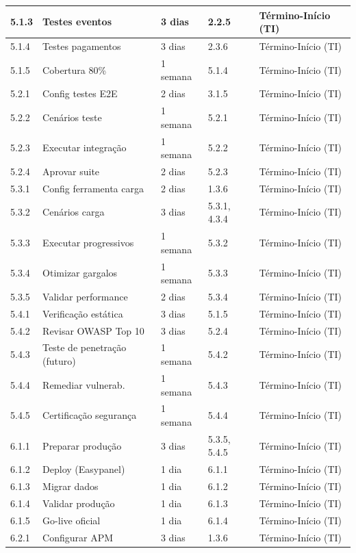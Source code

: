 \begin{table}[H]
\begin{tabular}{|p{1cm}|p{5cm}|p{2cm}|p{1.5cm}|p{3cm}|}
5.1.3 & Testes eventos & 3 dias & 2.2.5 & Término-Início (TI) \\ \hline
5.1.4 & Testes pagamentos & 3 dias & 2.3.6 & Término-Início (TI) \\ \hline
5.1.5 & Cobertura 80\% & 1 semana & 5.1.4 & Término-Início (TI) \\ \hline
5.2.1 & Config testes E2E & 2 dias & 3.1.5 & Término-Início (TI) \\ \hline
5.2.2 & Cenários teste & 1 semana & 5.2.1 & Término-Início (TI) \\ \hline
5.2.3 & Executar integração & 1 semana & 5.2.2 & Término-Início (TI) \\ \hline
5.2.4 & Aprovar suite & 2 dias & 5.2.3 & Término-Início (TI) \\ \hline
5.3.1 & Config ferramenta carga & 2 dias & 1.3.6 & Término-Início (TI) \\ \hline
5.3.2 & Cenários carga & 3 dias & 5.3.1, 4.3.4 & Término-Início (TI) \\ \hline
5.3.3 & Executar progressivos & 1 semana & 5.3.2 & Término-Início (TI) \\ \hline
5.3.4 & Otimizar gargalos & 1 semana & 5.3.3 & Término-Início (TI) \\ \hline
5.3.5 & Validar performance & 2 dias & 5.3.4 & Término-Início (TI) \\ \hline
5.4.1 & Verificação estática & 3 dias & 5.1.5 & Término-Início (TI) \\ \hline
5.4.2 & Revisar OWASP Top 10 & 3 dias & 5.2.4 & Término-Início (TI) \\ \hline
5.4.3 & Teste de penetração (futuro) & 1 semana & 5.4.2 & Término-Início (TI) \\ \hline
5.4.4 & Remediar vulnerab. & 1 semana & 5.4.3 & Término-Início (TI) \\ \hline
5.4.5 & Certificação segurança & 1 semana & 5.4.4 & Término-Início (TI) \\ \hline
6.1.1 & Preparar produção & 3 dias & 5.3.5, 5.4.5 & Término-Início (TI) \\ \hline
6.1.2 & Deploy (Easypanel) & 1 dia & 6.1.1 & Término-Início (TI) \\ \hline
6.1.3 & Migrar dados & 1 dia & 6.1.2 & Término-Início (TI) \\ \hline
6.1.4 & Validar produção & 1 dia & 6.1.3 & Término-Início (TI) \\ \hline
6.1.5 & Go-live oficial & 1 dia & 6.1.4 & Término-Início (TI) \\ \hline
6.2.1 & Configurar APM & 3 dias & 1.3.6 & Término-Início (TI) \\ \hline

\end{tabular}
\end{table}
